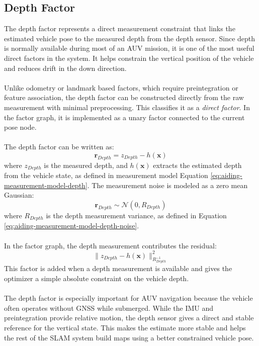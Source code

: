 \subsection{Depth Factor}
The depth factor represents a direct measurement constraint that links the estimated vehicle pose to the measured depth from the depth sensor. Since depth is normally available during most of an AUV mission, it is one of the most useful direct factors in the system. It helps constrain the vertical position of the vehicle and reduces drift in the down direction.
\\ \\
Unlike odometry or landmark based factors, which require preintegration or feature association, the depth factor can be constructed directly from the raw measurement with minimal preprocessing. This classifies it as a \textit{direct factor}. In the factor graph, it is implemented as a unary factor connected to the current pose node.
\\ \\
The depth factor can be written as:
$$
    \mathbf{r}_{Depth} = z_{Depth} - h(\mathbf{x})
$$
where $z_{Depth}$ is the measured depth, and $h(\mathbf{x})$ extracts the estimated depth from the vehicle state, as defined in measurement model Equation \ref{eq:aiding-measurement-model-depth}. The measurement noise is modeled as a zero mean Gaussian:
$$
    \mathbf{r}_{Depth} \sim \mathcal{N}(0, R_{Depth})
$$
where $R_{Depth}$ is the depth measurement variance, as defined in Equation \ref{eq:aiding-measurement-model-depth-noise}.
\\ \\
In the factor graph, the depth measurement contributes the residual:
$$
    \| z_{Depth} - h(\mathbf{x}) \|^2_{R_{Depth}^{-1}}
$$
This factor is added when a depth measurement is available and gives the optimizer a simple absolute constraint on the vehicle depth.
\\ \\
The depth factor is especially important for AUV navigation because the vehicle often operates without GNSS while submerged. While the IMU and preintegration provide relative motion, the depth sensor gives a direct and stable reference for the vertical state. This makes the estimate more stable and helps the rest of the SLAM system build maps using a better constrained vehicle pose.

